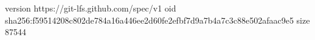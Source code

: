 version https://git-lfs.github.com/spec/v1
oid sha256:f59514208c802de784a16a446ee2d60fe2efbf7d9a7b4a7c3c88e502afaac9e5
size 87544
